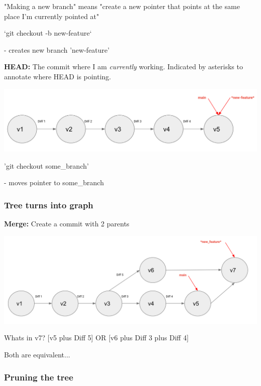 \documentclass{article}
\begin{document}
"Making a new branch" means "create a new pointer that points at the same place I'm currently pointed at"

\vspace*{1em}

`git checkout -b new-feature`\par
- creates new branch 'new-feature'

\vspace*{1em}

\textbf{HEAD: } The commit where I am \textit{currently} working. Indicated by asterisks to annotate where HEAD is pointing.

\includegraphics*[width=\linewidth]{gitBranch.png}

'git checkout some\_branch'\par
- moves pointer to some\_branch

\subsubsection{Tree turns into graph}

\textbf{Merge:} Create a commit with 2 parents

\includegraphics*[width=\linewidth]{gitMerge.png}
\begin{center}
    Whats in v7? [v5 plus Diff 5] OR [v6 plus Diff 3 plus Diff 4]

    Both are equivalent...
\end{center}

\subsubsection{Pruning the tree}
\end{document}
